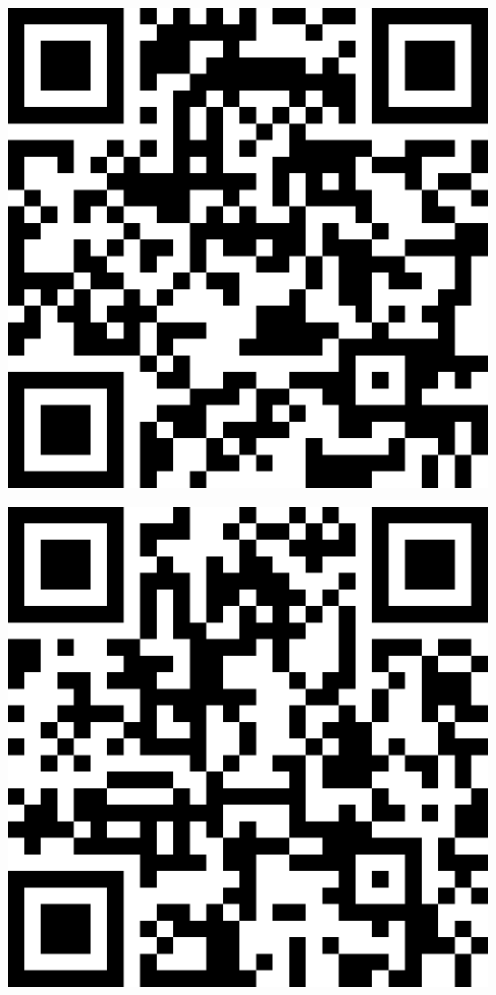 \documentclass[letterpaper]{article}
\begin{document}
 \endgroup 
 \vspace*{\fill} 
 \pagebreak 
{} 
 \vspace*{\fill} 
 \begingroup 
 \centerline{\includegraphics[scale=1,width=5in,height=5in]{DistribLab.png}} 
 \endgroup 
 \vspace*{\fill} 
 \pagebreak 
{} 
 \vspace*{\fill} 
 \begingroup 
 \centerline{\includegraphics[scale=1,width=5in,height=5in]{GradCenter.png}} 
\end{document}
